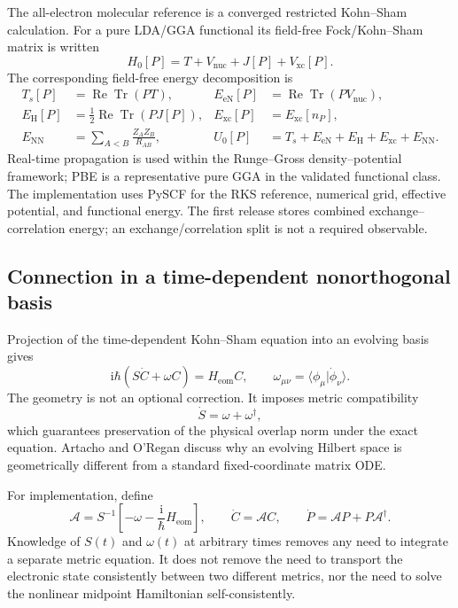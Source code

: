 \documentclass[11pt]{article}
\newcommand{\ii}{\mathrm{i}}
\newcommand{\hH}{H_{\mathrm{eom}}}
\newcommand{\ReTr}{\operatorname{Re}\operatorname{Tr}}
\begin{document}
The all-electron molecular reference is a converged restricted Kohn--Sham
calculation. For a pure LDA/GGA functional its field-free Fock/Kohn--Sham
matrix is written
\begin{equation}
 H_0[P]=T+V_{\mathrm{nuc}}+J[P]+V_{\mathrm{xc}}[P].
\end{equation}
The corresponding field-free energy decomposition is
\begin{align}
 T_s[P]&=\ReTr(PT),&
 E_{\mathrm{eN}}[P]&=\ReTr(PV_{\mathrm{nuc}}),\\
 E_{\mathrm H}[P]&=\frac12\ReTr(PJ[P]),&
 E_{\mathrm{xc}}[P]&=E_{\mathrm{xc}}[n_P],\\
 E_{\mathrm{NN}}&=\sum_{A<B}\frac{Z_AZ_B}{R_{AB}},&
 U_0[P]&=T_s+E_{\mathrm{eN}}+E_{\mathrm H}
       +E_{\mathrm{xc}}+E_{\mathrm{NN}}.
 \label{eq:dft-energy}
\end{align}
Real-time propagation is used within the Runge--Gross density--potential
framework\cite{RungeGross1984}; PBE is a representative pure GGA in the
validated functional class\cite{PBE1996}.
The implementation uses PySCF for the RKS reference, numerical grid, effective
potential, and functional energy\cite{Sun2018}. The first release stores
combined exchange--correlation energy; an exchange/correlation split is not a
required observable.

\subsection{Connection in a time-dependent nonorthogonal basis}

Projection of the time-dependent Kohn--Sham equation into an evolving basis
gives
\begin{equation}
 \ii\hbar\left(S\dot C+\omega C\right)=\hH C,
 \qquad
 \omega_{\mu\nu}
 =\langle\phi_\mu\vert\dot\phi_\nu\rangle .
 \label{eq:general-eom}
\end{equation}
The geometry is not an optional correction. It imposes metric compatibility
\begin{equation}
 \dot S=\omega+\omega^\dagger,
 \label{eq:metric-compatibility}
\end{equation}
which guarantees preservation of the physical overlap norm under the exact
equation. Artacho and O'Regan discuss why an evolving Hilbert space is
geometrically different from a standard fixed-coordinate matrix
ODE\cite{ArtachoORegan2017}.

For implementation, define
\begin{equation}
 \mathcal A=S^{-1}\left[-\omega-\frac{\ii}{\hbar}\hH\right],
 \qquad \dot C=\mathcal A C,
 \qquad \dot P=\mathcal A P+P\mathcal A^\dagger.
 \label{eq:generator-density}
\end{equation}
Knowledge of \(S(t)\) and \(\omega(t)\) at arbitrary times removes any need
to integrate a separate metric equation. It does not remove the need to
transport the electronic state consistently between two different metrics,
nor the need to solve the nonlinear midpoint Hamiltonian self-consistently.
\end{document}
